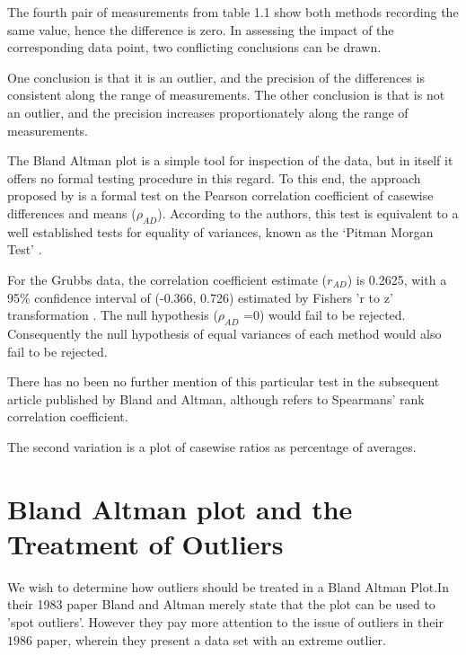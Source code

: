 \documentclass[12pt, a4paper]{report}
\begin{document}
The fourth pair of measurements from table 1.1 show both methods
recording the same value, hence the difference is zero. In
assessing the impact of the corresponding data point, two
conflicting conclusions can be drawn.

One conclusion is that it is an outlier, and the precision of the
differences is consistent along the range of measurements. The
other conclusion is that is not an outlier, and the precision
increases proportionately along the range of measurements.

The Bland Altman plot is a simple tool for inspection of the data,
but in itself it offers no formal testing procedure in this
regard. To this end, the approach proposed by \citet{BA83} is a
formal test on the Pearson correlation coefficient  of casewise
differences and means ($\rho_{AD}$). According to the authors,
this test is equivalent to a well established tests for equality
of variances, known as the `Pitman Morgan Test' \citep{Pitman,
Morgan}.

For the Grubbs data, the correlation coefficient estimate
($r_{AD}$) is 0.2625, with a 95\% confidence interval of (-0.366,
0.726) estimated by Fishers 'r to z' transformation \citep{Cohen}.
The null hypothesis ($\rho_{AD}$ =0) would fail to be rejected.
Consequently the null hypothesis of equal variances of each method
would also fail to be rejected.

There has no been no further mention of this particular test in
the subsequent article published by Bland and Altman, although
\citet{BA99} refers to Spearmans' rank correlation coefficient.

The second variation is a plot of casewise ratios as percentage of
averages.



\section{Bland Altman plot and the Treatment of Outliers}
We wish to determine how outliers should be treated in a Bland
Altman Plot.In their 1983 paper Bland and Altman  merely state
that the plot can be used to 'spot outliers'. However they pay
more attention to the issue of outliers in their $1986$ paper,
wherein they present a data set with an extreme outlier.
\end{document}
